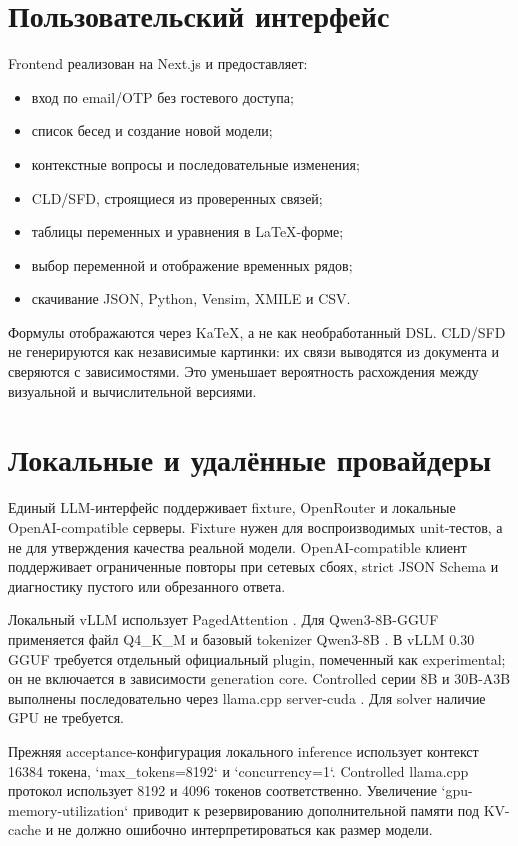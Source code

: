 \section{Пользовательский интерфейс}

Frontend реализован на Next.js \cite{nextjs2024} и предоставляет:

\begin{itemize}
    \item вход по email/OTP без гостевого доступа;
    \item список бесед и создание новой модели;
    \item контекстные вопросы и последовательные изменения;
    \item CLD/SFD, строящиеся из проверенных связей;
    \item таблицы переменных и уравнения в LaTeX-форме;
    \item выбор переменной и отображение временных рядов;
    \item скачивание JSON, Python, Vensim, XMILE и CSV.
\end{itemize}

Формулы отображаются через KaTeX, а не как необработанный DSL. CLD/SFD не генерируются как независимые картинки: их связи выводятся из документа и сверяются с зависимостями. Это уменьшает вероятность расхождения между визуальной и вычислительной версиями.

\section{Локальные и удалённые провайдеры}

Единый LLM-интерфейс поддерживает fixture, OpenRouter и локальные OpenAI-compatible серверы. Fixture нужен для воспроизводимых unit-тестов, а не для утверждения качества реальной модели. OpenAI-compatible клиент поддерживает ограниченные повторы при сетевых сбоях, strict JSON Schema и диагностику пустого или обрезанного ответа.

Локальный vLLM использует PagedAttention \cite{kwon2023pagedattention}. Для Qwen3-8B-GGUF применяется файл Q4\_K\_M и базовый tokenizer Qwen3-8B \cite{qwen2025technical}. В vLLM 0.30 GGUF требуется отдельный официальный plugin, помеченный как experimental; он не включается в зависимости generation core. Controlled серии 8B и 30B-A3B выполнены последовательно через llama.cpp server-cuda \cite{llama_cpp}. Для solver наличие GPU не требуется.

Прежняя acceptance-конфигурация локального inference использует контекст 16384 токена, `max\_tokens=8192` и `concurrency=1`. Controlled llama.cpp протокол использует 8192 и 4096 токенов соответственно. Увеличение `gpu-memory-utilization` приводит к резервированию дополнительной памяти под KV-cache и не должно ошибочно интерпретироваться как размер модели.

